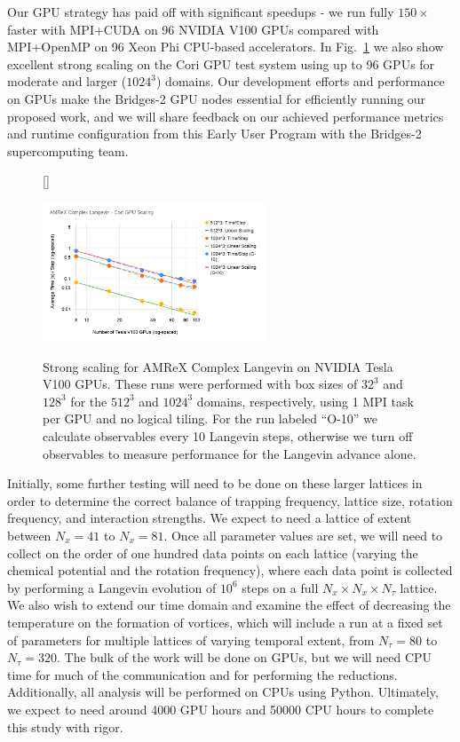 \documentclass[onecolumn, 12pt]{article}
\begin{document}
Our GPU strategy has paid off with significant speedups - we run fully $150\times$ faster with MPI+CUDA on 96 NVIDIA V100 GPUs compared with MPI+OpenMP on 96 Xeon Phi CPU-based accelerators.
In Fig.~\ref{Fig:GPUScaling} we also show excellent strong scaling on the Cori GPU test system using up to 96 GPUs for moderate and larger ($1024^3$) domains. Our development efforts and performance on GPUs make the Bridges-2 GPU nodes essential for efficiently running our proposed work, and we will share feedback on our achieved performance metrics and runtime configuration from this Early User Program with the Bridges-2 supercomputing team.

%
\begin{figure}[h]
[\FBwidth]
    {\caption{Strong scaling for AMReX Complex Langevin on NVIDIA Tesla V100 GPUs. These runs were performed with box sizes of $32^3$ and $128^3$ for the $512^3$ and $1024^3$ domains, respectively, using 1 MPI task per GPU and no logical tiling. For the run labeled ``O-10'' we calculate observables every 10 Langevin steps, otherwise we turn off observables to measure performance for the Langevin advance alone.}\label{Fig:GPUScaling}}
    {\includegraphics[width=0.6\textwidth]{./AMReX_Complex_Langevin_Cori_GPU_Scaling.png}}
\end{figure}
%

Initially, some further testing will need to be done on these larger lattices in order to determine the correct balance of trapping frequency, lattice size, rotation frequency, and interaction strengths. We expect to need a lattice of extent between $N_{x} = 41$ to $N_{x} = 81$. Once all parameter values are set, we will need to collect on the order of one hundred data points on each lattice (varying the chemical potential and the rotation frequency), where each data point is collected by performing a Langevin evolution of $10^{6}$ steps on a full $N_{x} \times N_{x} \times N_{\tau}$ lattice. We also wish to extend our time domain and examine the effect of decreasing the temperature on the formation of vortices, which will include a run at a fixed set of parameters for multiple lattices of varying temporal extent, from $N_{\tau} = 80$ to $N_{\tau} = 320$. The bulk of the work will be done on GPUs, but we will need CPU time for much of the communication and for performing the reductions. Additionally, all analysis will be performed on CPUs using Python. Ultimately, we expect to need around 4000 GPU hours and 50000 CPU hours to complete this study with rigor.

{}
%

\end{document}
